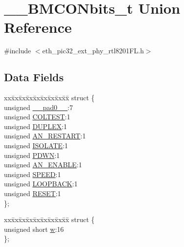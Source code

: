 \hypertarget{union_____b_m_c_o_nbits__t}{}\section{\+\_\+\+\_\+\+B\+M\+C\+O\+Nbits\+\_\+t Union Reference}
\label{union_____b_m_c_o_nbits__t}


{\ttfamily \#include $<$eth\+\_\+pic32\+\_\+ext\+\_\+phy\+\_\+rtl8201\+F\+L.\+h$>$}

\subsection*{Data Fields}
\begin{DoxyCompactItemize}
\item 
\begin{tabbing}
xx\=xx\=xx\=xx\=xx\=xx\=xx\=xx\=xx\=\kill
struct \{\\
\>unsigned \hyperlink{union_____b_m_c_o_nbits__t_adf71f3d8410c1f1dbbc96680a92c49af}{\_\_pad0\_\_}:7\\
\>unsigned \hyperlink{union_____b_m_c_o_nbits__t_a9c09d7e7c7ef351fc2b6c37785069ab1}{COLTEST}:1\\
\>unsigned \hyperlink{union_____b_m_c_o_nbits__t_aad2d5b585da6df0c08919f0e0749562e}{DUPLEX}:1\\
\>unsigned \hyperlink{union_____b_m_c_o_nbits__t_a1d18945aae4c125b483cbab7196fa3bc}{AN\_RESTART}:1\\
\>unsigned \hyperlink{union_____b_m_c_o_nbits__t_a08f1e090660f38e2c355348499059646}{ISOLATE}:1\\
\>unsigned \hyperlink{union_____b_m_c_o_nbits__t_a1d62ad60d164ae9584ed177c6d49d0c2}{PDWN}:1\\
\>unsigned \hyperlink{union_____b_m_c_o_nbits__t_ac70b16effdab4243521af72c0c4561d2}{AN\_ENABLE}:1\\
\>unsigned \hyperlink{union_____b_m_c_o_nbits__t_a95fd4dafd860304d6b44d4fb14881daa}{SPEED}:1\\
\>unsigned \hyperlink{union_____b_m_c_o_nbits__t_ac7c74d910281b89b2cbb9179d671358c}{LOOPBACK}:1\\
\>unsigned \hyperlink{union_____b_m_c_o_nbits__t_abd544ef72bf6c8e26d48024e20c2ac9b}{RESET}:1\\
\}; \\

\end{tabbing}\item 
\begin{tabbing}
xx\=xx\=xx\=xx\=xx\=xx\=xx\=xx\=xx\=\kill
struct \{\\
\>unsigned short \hyperlink{union_____b_m_c_o_nbits__t_a160850a4684a3e82c2323033964f2e98}{w}:16\\
\}; \\


\end{tabbing}
\end{DoxyCompactItemize}
